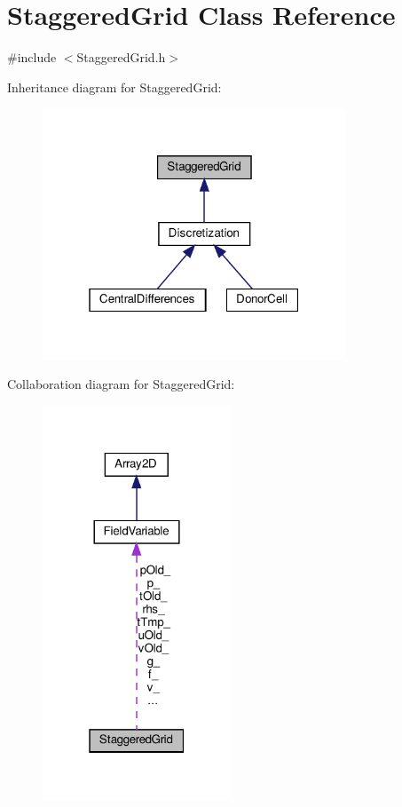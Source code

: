 \hypertarget{classStaggeredGrid}{}\section{Staggered\+Grid Class Reference}
\label{classStaggeredGrid}


{\ttfamily \#include $<$Staggered\+Grid.\+h$>$}



Inheritance diagram for Staggered\+Grid\+:\nopagebreak
\begin{figure}[H]
\begin{center}
\leavevmode
\includegraphics[width=256pt]{classStaggeredGrid__inherit__graph}
\end{center}
\end{figure}


Collaboration diagram for Staggered\+Grid\+:
\nopagebreak
\begin{figure}[H]
\begin{center}
\leavevmode
\includegraphics[width=159pt]{classStaggeredGrid__coll__graph}
\end{center}
\end{figure}
